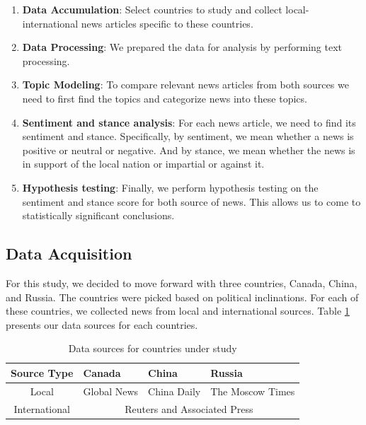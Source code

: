 \documentclass{article}
\theoremstyle{mytheoremstyle}
\theoremstyle{mytheoremstyle}
\theoremstyle{myproblemstyle}
\begin{document}
    \begin{enumerate}
        \item \textbf{Data Accumulation}: Select countries to study and collect local-international news articles specific to these countries.
        \item \textbf{Data Processing}: We prepared the data for analysis by performing text processing.
        \item \textbf{Topic Modeling}: To compare relevant news articles from both sources we need to first find the topics and categorize news into these topics.
        \item \textbf{Sentiment and stance analysis}: For each news article, we need to find its sentiment and stance. Specifically, by sentiment, we mean whether a news is positive or neutral or negative. And by stance, we mean whether the news is in support of the local nation or impartial or against it.
        \item \textbf{Hypothesis testing}: Finally, we perform hypothesis testing on the sentiment and stance score for both source of news. This allows us to come to statistically significant conclusions.
    \end{enumerate}

    \subsection{Data Acquisition}

    For this study, we decided to move forward with three countries, Canada, China, and Russia. The countries were picked based on political inclinations. For each of these countries, we collected news from local and international sources. Table \ref{table:data_sources} presents our data sources for each countries.

    \begin{table}[ph]
        \centering
        \begin{tabular}{|c|l|l|l|}
            \hline
            Source Type & Canada & China & Russia \\
            \hline
            Local & Global News & China Daily & The Moscow Times \\
            \hline
            International & \multicolumn{3}{c|}{Reuters and Associated Press} \\
            \hline
        \end{tabular}
        \caption{Data sources for countries under study}
        \label{table:data_sources}
    \end{table}
\end{document}
